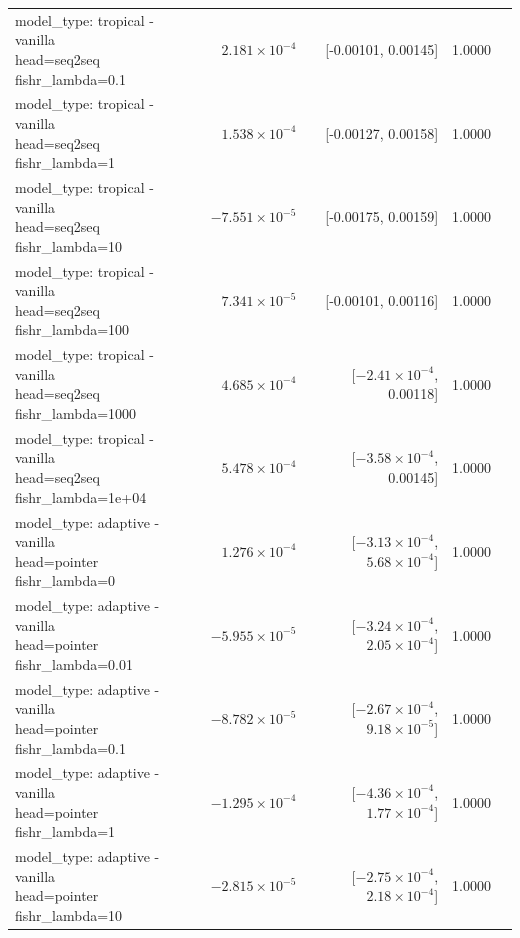 \documentclass[10pt]{article}
\makeatletter
\newcommand{\stackcell}[1]{\begin{tabular}[t]{@{}l@{}}#1\end{tabular}}
\makeatother
\begin{document}
{\begin{longtable}{lrrrl}
\stackcell{model\_type: tropical - vanilla\\\footnotesize head=seq2seq fishr\_lambda=0.1 } & $2.181\times10^{-4}$ & [-0.00101, 0.00145] & 1.0000 & \\
\stackcell{model\_type: tropical - vanilla\\\footnotesize head=seq2seq fishr\_lambda=1 } & $1.538\times10^{-4}$ & [-0.00127, 0.00158] & 1.0000 & \\
\stackcell{model\_type: tropical - vanilla\\\footnotesize head=seq2seq fishr\_lambda=10 } & $-7.551\times10^{-5}$ & [-0.00175, 0.00159] & 1.0000 & \\
\stackcell{model\_type: tropical - vanilla\\\footnotesize head=seq2seq fishr\_lambda=100 } & $7.341\times10^{-5}$ & [-0.00101, 0.00116] & 1.0000 & \\
\stackcell{model\_type: tropical - vanilla\\\footnotesize head=seq2seq fishr\_lambda=1000 } & $4.685\times10^{-4}$ & [$-2.41\times10^{-4}$, 0.00118] & 1.0000 & \\
\stackcell{model\_type: tropical - vanilla\\\footnotesize head=seq2seq fishr\_lambda=1e+04 } & $5.478\times10^{-4}$ & [$-3.58\times10^{-4}$, 0.00145] & 1.0000 & \\
\stackcell{model\_type: adaptive - vanilla\\\footnotesize head=pointer fishr\_lambda=0 } & $1.276\times10^{-4}$ & [$-3.13\times10^{-4}$, $5.68\times10^{-4}$] & 1.0000 & \\
\stackcell{model\_type: adaptive - vanilla\\\footnotesize head=pointer fishr\_lambda=0.01 } & $-5.955\times10^{-5}$ & [$-3.24\times10^{-4}$, $2.05\times10^{-4}$] & 1.0000 & \\
\stackcell{model\_type: adaptive - vanilla\\\footnotesize head=pointer fishr\_lambda=0.1 } & $-8.782\times10^{-5}$ & [$-2.67\times10^{-4}$, $9.18\times10^{-5}$] & 1.0000 & \\
\stackcell{model\_type: adaptive - vanilla\\\footnotesize head=pointer fishr\_lambda=1 } & $-1.295\times10^{-4}$ & [$-4.36\times10^{-4}$, $1.77\times10^{-4}$] & 1.0000 & \\
\stackcell{model\_type: adaptive - vanilla\\\footnotesize head=pointer fishr\_lambda=10 } & $-2.815\times10^{-5}$ & [$-2.75\times10^{-4}$, $2.18\times10^{-4}$] & 1.0000 & \\

\end{longtable}}
\end{document}

